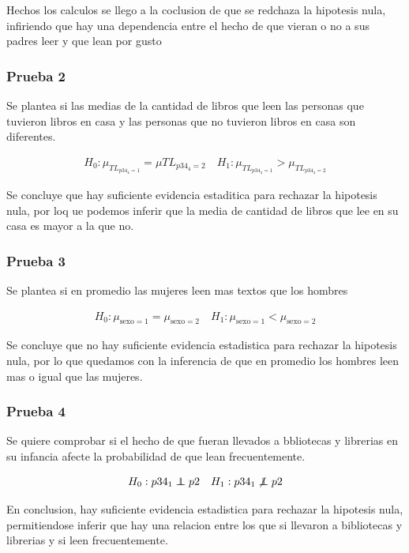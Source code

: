 \documentclass[aps,reprint]{revtex4-2}
\begin{document}
Hechos los calculos se llego a la coclusion de que se redchaza la hipotesis nula, infiriendo que hay una dependencia entre el hecho de que vieran o no a sus padres leer y que lean por gusto

\subsubsection{Prueba 2}

Se plantea si las medias de la cantidad de libros que leen las personas que tuvieron libros en casa y las personas que no tuvieron libros en casa son diferentes.

\begin{align}
  H_0: \mu_{TL_{p34_4=1}}=\mu{TL_{p34_4=2}}\quad H_1:\mu_{TL_{p34_4=1}}>\mu_{TL_{p34_4=2}}
\end{align}

Se concluye que hay suficiente evidencia estaditica para rechazar la hipotesis nula, por loq ue podemos inferir que la media de cantidad de libros que lee en su casa es mayor a la que no.

\subsubsection{Prueba 3}

Se plantea si en promedio las mujeres leen mas textos que los hombres

\begin{align}
  H_0:\mu_{\text{sexo}=1}=\mu_{\text{sexo}=2}\quad H_1:\mu_{\text{sexo}=1}<\mu_{\text{sexo}=2}
\end{align}

Se concluye que no hay suficiente evidencia estadistica para rechazar la hipotesis nula, por lo que quedamos con la inferencia de que en promedio los hombres leen mas o igual que las mujeres.

\subsubsection{Prueba 4}

Se quiere comprobar si el hecho de que fueran llevados a bbliotecas y librerias en su infancia afecte la probabilidad de que lean frecuentemente.

\begin{align}
  H_0:p34_1\independent p2\quad H_1:p34_1\not\independent p2
\end{align}

En conclusion, hay suficiente evidencia estadistica para rechazar la hipotesis nula, permitiendose inferir que hay una relacion entre los que si llevaron a bibliotecas y librerias y si leen frecuentemente.
\end{document}
